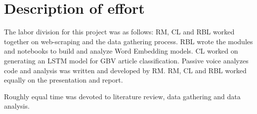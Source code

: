 \documentclass{article}
\begin{document}
\newpage
\raggedbottom
\section{Description of effort}{

The labor division for this project was as follows: RM, CL and RBL worked together on web-scraping and the data gathering process. RBL wrote the modules and notebooks to build and analyze Word Embedding models. CL worked on generating an LSTM model for GBV article classification. Passive voice analyzes code and analysis was written and developed by RM. RM, CL and RBL worked equally on the presentation and report.

Roughly equal time was devoted to literature review, data gathering and data analysis.

}


\newpage
\end{document}
